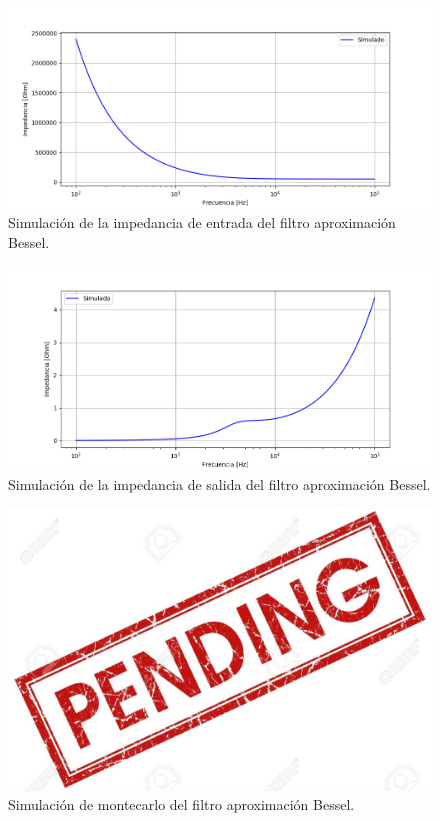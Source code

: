 \begin{figure}[H]
\centering
	\centering
	\includegraphics[width=\textwidth]{Imagenes-Ej1/bessel_zin_sim.png}
	\caption{Simulación de la impedancia de entrada del filtro aproximación Bessel.}
	\label{bes_zin_sim}
\end{figure}

\begin{figure}[H]
\centering
	\centering
	\includegraphics[width=\textwidth]{Imagenes-Ej1/bessel_zout_sim.png}
	\caption{Simulación de la impedancia de salida del filtro aproximación Bessel.}
	\label{bes_zout_sim}
\end{figure}

\begin{figure}[H]
\centering
	\centering
	\includegraphics[width=\textwidth]{Imagenes-Ej1/pend.jpg}
	\caption{Simulación de montecarlo del filtro aproximación Bessel.}
	\label{bes_mont_sim}
\end{figure}

